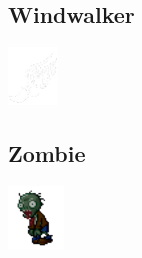 \documentclass[a4paper,12pt]{scrartcl}
\begin{document}
	\subsection{Windwalker}
	\begin{center}\includegraphics{Prog2_EA_V2/Art/Windwalker.png}\end{center}
	\subsection{Zombie}
	\begin{center}\includegraphics{Prog2_EA_V2/Art/Zombie.png}\end{center}
\end{document}
